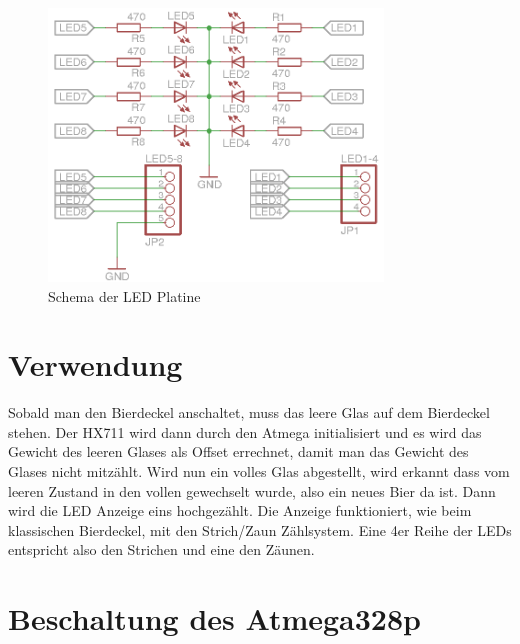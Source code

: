 \documentclass[12pt,journal,compsoc]{IEEEtran}
\begin{document}
%
%
\begin{figure}[!t]
  \centering
    \includegraphics[width=3.5in]{images/LED_Platine_Schema_complete.png}
    \caption{Schema der LED Platine}
  \label{fig_led_platine}
\end{figure}

\section{Verwendung}

Sobald man den Bierdeckel anschaltet, muss das leere Glas auf dem Bierdeckel stehen.
Der HX711 wird dann durch den Atmega initialisiert und es wird das Gewicht des leeren Glases
als Offset errechnet, damit man das Gewicht des Glases nicht mitzählt. Wird nun ein volles Glas
abgestellt, wird erkannt dass vom leeren Zustand in den vollen gewechselt wurde, also ein neues
Bier da ist. Dann wird die LED Anzeige eins hochgezählt. Die Anzeige funktioniert,
wie beim klassischen Bierdeckel, mit den Strich/Zaun Zählsystem. Eine 4er Reihe der LEDs
entspricht also den Strichen und eine den Zäunen.

\section{Beschaltung des Atmega328p}
\end{document}
